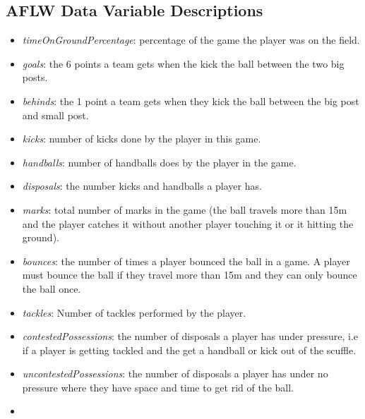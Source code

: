 \hypertarget{aflw-data-variable-descriptions}{%
\subsection{AFLW Data Variable
Descriptions}\label{aflw-data-variable-descriptions}}

\begin{itemize}
\tightlist
\item
  \emph{timeOnGroundPercentage}: percentage of the game the player was
  on the field.\\
\item
  \emph{goals}: the 6 points a team gets when the kick the ball between
  the two big posts.\\
\item
  \emph{behinds}: the 1 point a team gets when they kick the ball
  between the big post and small post.\\
\item
  \emph{kicks}: number of kicks done by the player in this game.\\
\item
  \emph{handballs}: number of handballs does by the player in the
  game.\\
\item
  \emph{disposals}: the number kicks and handballs a player has.\\
\item
  \emph{marks}: total number of marks in the game (the ball travels more
  than 15m and the player catches it without another player touching it
  or it hitting the ground).\\
\item
  \emph{bounces}: the number of times a player bounced the ball in a
  game. A player must bounce the ball if they travel more than 15m and
  they can only bounce the ball once.\\
\item
  \emph{tackles}: Number of tackles performed by the player.\\
\item
  \emph{contestedPossessions}: the number of disposals a player has
  under pressure, i.e if a player is getting tackled and the get a
  handball or kick out of the scuffle.\\
\item
  \emph{uncontestedPossessions}: the number of disposals a player has
  under no pressure where they have space and time to get rid of the
  ball.\\
\item

\end{itemize}
